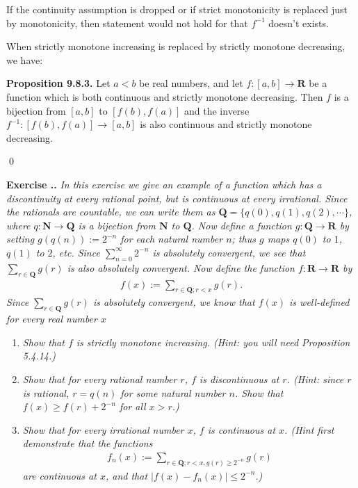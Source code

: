 \documentclass{book}
\newcommand{\titl}[1]{\noindent\textbf{#1}}
\newcounter{Exercise}[section]
\renewcommand{\theExercise}{\thesection.\arabic{Exercise}.}
\newcommand{\new}{\vspace{1.5em}\noindent\textbf{{Exercise \stepcounter{Exercise}\textbf{\theExercise}}} }
\begin{document}
If the continuity assumption is dropped or if strict monotonicity is replaced just by monotonicity, then statement would not hold for that $f^{-1}$ doesn't exists.

When strictly monotone increasing is replaced by strictly monotone decreasing, we have:

\begin{framed}
\titl{Proposition 9.8.3.} Let $a<b$ be real numbers, and let $f:[a,b]\to\mathbf{R}$ be a function which is both continuous and strictly monotone decreasing. Then $f$ is a bijection from $[a,b]$ to $[f(b),f(a)]$ and the inverse $f^{-1}:[f(b),f(a)]\to[a,b]$ is also continuous and strictly monotone decreasing.
\end{framed}\qed

\new\emph{In this exercise we give an example of a function which has a discontinuity at every rational point, but is continuous at every irrational. Since the rationals are countable, we can write them as $\mathbf{Q}=\{q(0),q(1),q(2),\cdots\}$, where $q:\mathbf{N}\to\mathbf{Q}$ is a bijection from $\mathbf{N}$ to $\mathbf{Q}$. Now define a function $g:\mathbf{Q}\to\mathbf{R}$ by setting $g(q(n)):=2^{-n}$ for each natural number $n$; thus $g$ maps $q(0)$ to $1$, $q(1)$ to $2$, etc. Since $\sum_{n=0}^{\infty}2^{-n}$ is absolutely convergent, we see that $\sum_{r\in\mathbf{Q}}g(r)$ is also absolutely convergent. Now define the function $f:\mathbf{R}\to\mathbf{R}$ by}
    \begin{align*}
        f(x):=\sum_{r\in\mathbf{Q};r<x}g(r).
    \end{align*}
\emph{Since $\sum_{r\in\mathbf{Q}}g(r)$ is absolutely convergent, we know that $f(x)$ is well-defined for every real number $x$}
\begin{enumerate}
    \item \emph{Show that $f$ is strictly monotone increasing. (Hint: you will need Proposition 5.4.14.)}
    \item \emph{Show that for every rational number $r$, $f$ is discontinuous at $r$. (Hint: since $r$ is rational, $r=q(n)$ for some natural number $n$. Show that $f(x)\geq f(r)+2^{-n}$ for all $x>r$.)}
    \item \emph{Show that for every irrational number $x$, $f$ is continuous at $x$. (Hint first demonstrate that the functions}
            \begin{align*}
                f_n(x):=\sum_{r\in\mathbf{Q};r<x,g(r)\geq 2^{-n}}g(r)
            \end{align*}
    \emph{are continuous at $x$, and that $|f(x)-f_n(x)|\leq 2^{-n}$.)}
\end{enumerate}
\end{document}
